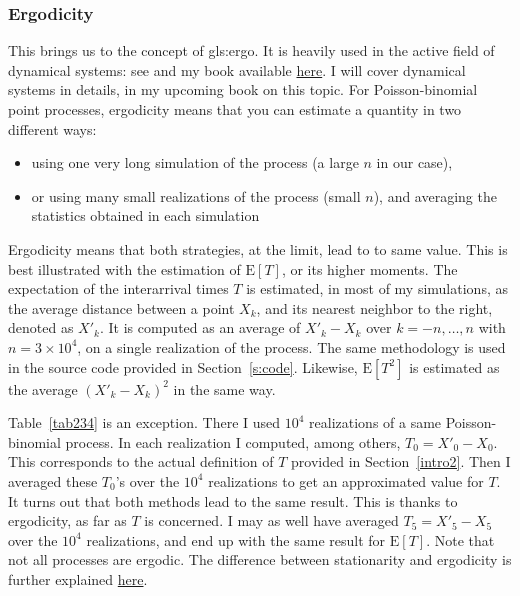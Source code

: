 \documentclass[10pt]{article}
\begin{document}
\subsubsection{Ergodicity}
This brings us to the concept of \gls{gls:ergo}.  It is heavily used
in the active field of \textcolor{index}{dynamical systems}: see \cite{dyn2,dyn3,dyn1} and my book \cite{vgdyn}
available \href{https://github.com/VincentGranville/Stochastic-Processes}{here}.
I will cover dynamical systems in details, in my upcoming book on this topic. For Poisson-binomial point processes, ergodicity means that you can estimate a quantity in two different ways:
\begin{itemize}
\item using one very long simulation of the process (a large $n$ in our case),
\item or using many small realizations of the process (small $n$), and averaging the statistics obtained in each simulation
\end{itemize}
Ergodicity means that both strategies, at the limit, lead to to same value. This is best illustrated with the estimation of $\mbox{E}[T]$, or its higher moments. The expectation of the interarrival times $T$ is estimated, in most of my simulations, as the average distance between a point $X_k$, and its nearest neighbor to the right, denoted as $X'_k$. It is computed as an average of $X'_k-X_k$  over $k=-n,\dots,n$ with $n = 3 \times 10^4$, on a single realization of the process. The same methodology is used in the source code provided in Section~\ref{s:code}.  Likewise, $\mbox{E}[T^2]$ is estimated as the average $(X'_k-X_k)^2$ in the same way.

Table~\ref{tab234} is an exception. There I used $10^4$ realizations of a same Poisson-binomial process. In each realization I computed, among others, $T_0=X'_0 - X_0$. This corresponds to the actual definition of $T$ provided in Section~\ref{intro2}. Then I averaged these $T_0$'s over the $10^4$ realizations to get an approximated value for $T$. It turns out that both methods lead to the same result. This is thanks to ergodicity, as far as $T$ is concerned. I may as well have averaged $T_5=X'_5 -X_5$ over the $10^4$ realizations, and end up with the same result for $\mbox{E}[T]$. Note that not all processes are ergodic. The difference between stationarity and ergodicity is further explained \href{https://dsp.stackexchange.com/questions/1167/what-is-the-distinction-between-ergodic-and-stationary}{here}.
\end{document}
